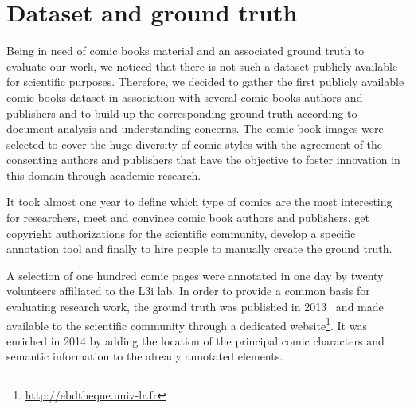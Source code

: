 

\section{Dataset and ground truth} %
\label{sec:dataset_and_ground_truth_construction}

Being in need of comic books material and an associated ground truth to evaluate our work, we noticed that there is not such a dataset publicly available for scientific purposes.
Therefore, we decided to gather the first publicly available comic books dataset in association with several comic books authors and publishers and to build up the corresponding ground truth according to document analysis and understanding concerns.
The comic book images were selected to cover the huge diversity of comic styles with the agreement of the consenting authors and publishers that have the objective to foster innovation in this domain through academic research.



It took almost one year to define which type of comics are the most interesting for researchers, meet and convince comic book authors and publishers, get copyright authorizations for the scientific community, develop a specific annotation tool and finally to hire people to manually create the ground truth.

A selection of one hundred comic pages were annotated in one day by twenty volunteers affiliated to the L3i lab.
In order to provide a common basis for evaluating research work, the ground truth was published in 2013~\cite{Guerin2013} and made available to the scientific community through a dedicated website\footnote{\url{http://ebdtheque.univ-lr.fr}}.
It was enriched in 2014 by adding the location of the principal comic characters and semantic information to the already annotated elements.


